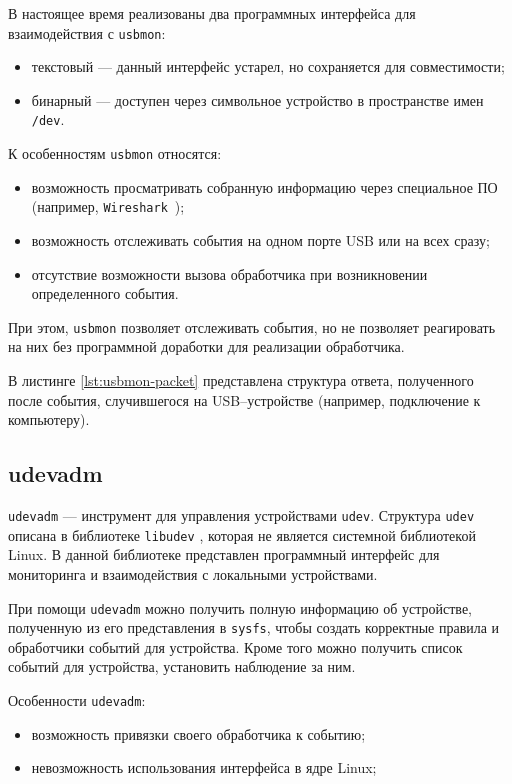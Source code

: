 В настоящее время реализованы два программных интерфейса для взаимодействия с \texttt{usbmon}: 
\begin{itemize}
    \item текстовый --- данный интерфейс устарел, но сохраняется для совместимости;
    \item бинарный --- доступен через символьное устройство в пространстве имен \texttt{/dev}.
\end{itemize}

К особенностям \texttt{usbmon} относятся:

\begin{itemize}
	\item возможность просматривать собранную информацию через специальное ПО (например, \texttt{Wireshark}~\cite{wireshark});
	\item возможность отслеживать события на одном порте USB или на всех сразу;
	\item отсутствие возможности вызова обработчика при возникновении определенного события.
\end{itemize}

При этом, \texttt{usbmon} позволяет отслеживать события, но не позволяет реагировать на них без программной доработки для реализации обработчика.

В листинге \ref{lst:usbmon-packet} представлена структура ответа, полученного после события, случившегося на USB--устройстве (например, подключение к компьютеру).

\subsection{udevadm}

\texttt{udevadm} \cite{udevadm} --- инструмент для управления устройствами \texttt{udev}. Структура \texttt{udev} описана в библиотеке \texttt{libudev} \cite{libudev}, которая не является системной библиотекой Linux. В данной библиотеке представлен программный интерфейс для мониторинга и взаимодействия с локальными устройствами.

При помощи \texttt{udevadm} можно получить полную информацию об устройстве, полученную из его представления в \texttt{sysfs}, чтобы создать корректные правила и обработчики событий для устройства. Кроме того можно получить список событий для устройства, установить наблюдение за ним.

Особенности \texttt{udevadm}:

\begin{itemize}
	\item возможность привязки своего обработчика к событию;
	\item невозможность использования интерфейса в ядре Linux;
\end{itemize}


